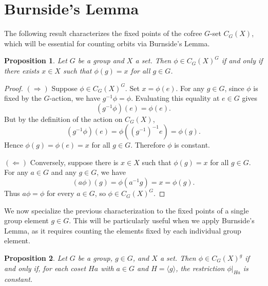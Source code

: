 \documentclass[10pt,a4paper]{amsart}
\newtheorem{proposition}{Proposition}
\begin{document}
\section{Burnside's Lemma}
\label{sec:burnside}

The following result characterizes the fixed points of the cofree $G$-set $C_G(X)$, which will be essential for counting orbits via Burnside's Lemma.

\begin{proposition}\label{prop:fixed_points_global}
Let $G$ be a group and $X$ a set. Then $\phi \in C_G(X)^G$ if and only if there exists $x \in X$ such that $\phi(g) = x$ for all $g \in G$.
\end{proposition}

\begin{proof}
$(\Rightarrow)$ Suppose $\phi \in C_G(X)^G$. Set $x = \phi(e)$. For any $g \in G$, since $\phi$ is fixed by the $G$-action, we have $g^{-1}\phi = \phi$. Evaluating this equality at $e \in G$ gives
\[
(g^{-1}\phi)(e) = \phi(e).
\]
But by the definition of the action on $C_G(X)$,
\[
(g^{-1}\phi)(e) = \phi((g^{-1})^{-1}e) = \phi(g).
\]
Hence $\phi(g) = \phi(e) = x$ for all $g \in G$. Therefore $\phi$ is constant.

$(\Leftarrow)$ Conversely, suppose there is $x \in X$ such that $\phi(g) = x$ for all $g \in G$. For any $a \in G$ and any $g \in G$, we have
\[
(a \phi)(g) = \phi(a^{-1}g) = x = \phi(g).
\]
Thus $a \phi = \phi$ for every $a \in G$, so $\phi \in C_G(X)^G$.
\end{proof}

We now specialize the previous characterization to the fixed points of a single group element $g \in G$. This will be particularly useful when we apply Burnside's Lemma, as it requires counting the elements fixed by each individual group element.

\begin{proposition}\label{prop:fixed_points_element}
Let $G$ be a group, $g \in G$, and $X$ a set. Then $\phi \in C_G(X)^g$ if and only if, for each coset $Ha$ with $a \in G$ and $H = \langle g \rangle$, the restriction $\phi|_{Ha}$ is constant.
\end{proposition}
\end{document}
